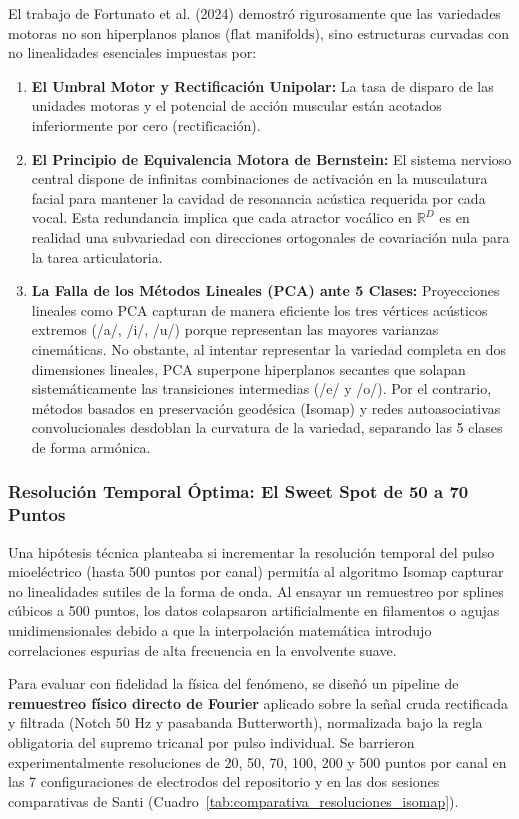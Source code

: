 \documentclass[11pt,a4paper]{article}
\begin{document}
El trabajo de Fortunato et al. (2024) demostró rigurosamente que las variedades motoras no son hiperplanos planos ($\text{flat manifolds}$), sino estructuras curvadas con no linealidades esenciales impuestas por:
\begin{enumerate}
    \item \textbf{El Umbral Motor y Rectificación Unipolar:} La tasa de disparo de las unidades motoras y el potencial de acción muscular están acotados inferiormente por cero ($\text{rectificación}$).
    \item \textbf{El Principio de Equivalencia Motora de Bernstein:} El sistema nervioso central dispone de infinitas combinaciones de activación en la musculatura facial para mantener la cavidad de resonancia acústica requerida por cada vocal. Esta redundancia implica que cada atractor vocálico en $\mathbb{R}^D$ es en realidad una subvariedad con direcciones ortogonales de covariación nula para la tarea articulatoria.
    \item \textbf{La Falla de los Métodos Lineales (PCA) ante 5 Clases:} Proyecciones lineales como PCA capturan de manera eficiente los tres vértices acústicos extremos (/a/, /i/, /u/) porque representan las mayores varianzas cinemáticas. No obstante, al intentar representar la variedad completa en dos dimensiones lineales, PCA superpone hiperplanos secantes que solapan sistemáticamente las transiciones intermedias (/e/ y /o/). Por el contrario, métodos basados en preservación geodésica (Isomap) y redes autoasociativas convolucionales desdoblan la curvatura de la variedad, separando las 5 clases de forma armónica.
\end{enumerate}

\subsubsection{Resolución Temporal Óptima: El Sweet Spot de 50 a 70 Puntos}
\label{subsubsec:sweet_spot_resolucion}

Una hipótesis técnica planteaba si incrementar la resolución temporal del pulso mioeléctrico (hasta 500 puntos por canal) permitía al algoritmo Isomap capturar no linealidades sutiles de la forma de onda. Al ensayar un remuestreo por splines cúbicos a 500 puntos, los datos colapsaron artificialmente en filamentos o agujas unidimensionales debido a que la interpolación matemática introdujo correlaciones espurias de alta frecuencia en la envolvente suave.

Para evaluar con fidelidad la física del fenómeno, se diseñó un pipeline de \textbf{remuestreo físico directo de Fourier} aplicado sobre la señal cruda rectificada y filtrada (Notch 50 Hz y pasabanda Butterworth), normalizada bajo la regla obligatoria del supremo tricanal por pulso individual. Se barrieron experimentalmente resoluciones de 20, 50, 70, 100, 200 y 500 puntos por canal en las 7 configuraciones de electrodos del repositorio y en las dos sesiones comparativas de Santi (Cuadro~\ref{tab:comparativa_resoluciones_isomap}).
\end{document}
